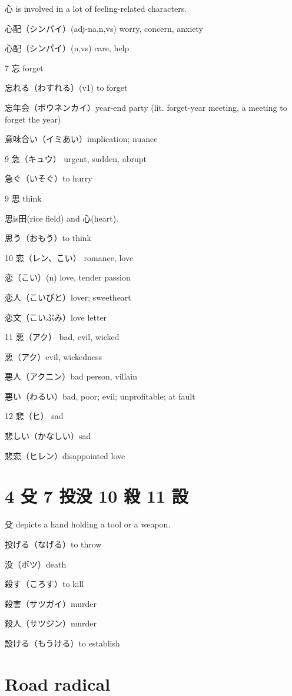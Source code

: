 心 is involved in a lot of feeling-related characters.

心配（シンパイ）(adj-na,n,vs) worry, concern, anxiety

心配（シンパイ）(n,vs) care, help

7 忘 forget

忘れる（わすれる）(v1) to forget

忘年会（ボウネンカイ）year-end party (lit. forget-year meeting, a meeting to forget the year)

意味合い（イミあい）implication; nuance

9 急（キュウ） urgent, sudden, abrupt

急ぐ（いそぐ）to hurry

9 思 think

思is田(rice field) and 心(heart).

思う（おもう）to think

10 恋（レン、こい） romance, love

恋（こい）(n) love, tender passion

恋人（こいびと）lover; sweetheart

恋文（こいぶみ）love letter

11 悪（アク） bad, evil, wicked

悪（アク）evil, wickedness

悪人（アクニン）bad person, villain

悪い（わるい）bad, poor; evil; unprofitable; at fault

12 悲（ヒ） sad

悲しい（かなしい）sad

悲恋（ヒレン）disappointed love

\section{4 殳 7 投没 10 殺 11 設}

殳 depicts a hand holding a tool or a weapon.

投げる（なげる）to throw

没（ボツ）death

殺す（ころす）to kill

殺害（サツガイ）murder

殺人（サツジン）murder

設ける（もうける）to establish

\section{Road radical}


